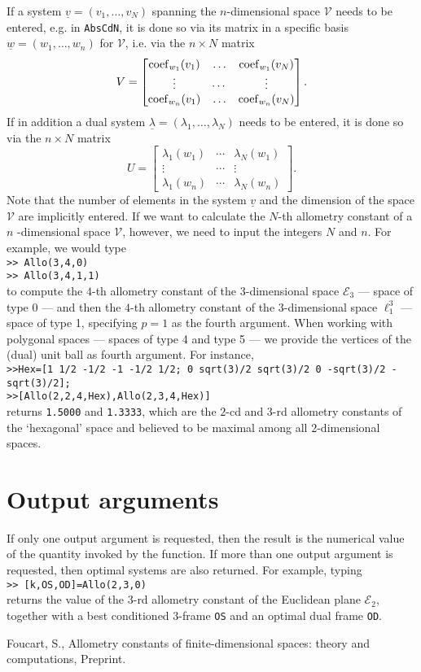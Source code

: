 \documentclass[11pt,leqno]{article}
\theoremstyle{plain}
\theoremstyle{definition}
\theoremstyle{remark}
\newcommand{\bbmx}{\begin{bmatrix}}
\newcommand{\ebmx}{\end{bmatrix}}
\newcommand{\EE}{\mathcal{E}}
\newcommand{\VV}{\mathcal{V}}
\newcommand{\ul}{\underline}
\newcommand{\la}{\lambda}
\begin{document}
 If a system $\ul{v}=(v_1,\ldots,v_N)$ spanning the $n$-dimensional space $\VV$ needs to be entered, e.g. in {\tt \small AbsCdN}, it is done so 
 via its matrix in a specific basis $\ul{w}=(w_1,\ldots,w_n)$ for $\VV$,
 i.e. via the $n \times N$ matrix
 $$
V= \bbmx
{\rm coef}_{w_1}(v_1) & \ldots & {\rm coef}_{w_1}(v_N)\\
\vdots & \cdots & \vdots\\
{\rm coef}_{w_n}(v_1) & \ldots & {\rm coef}_{w_n}(v_N)
\ebmx.
$$
If in addition a dual system $\ul{\la}=(\la_1,\ldots,\la_N)$  needs to be entered, it is done so via the $n \times N$ matrix
$$
U = \bbmx
\la_1(w_1) & \cdots & \la_N(w_1)\\
\vdots & \cdots & \vdots\\
\la_1(w_n) & \cdots & \la_N(w_n)
\ebmx .
$$
Note that the number of elements in the system $\ul{v}$ and the dimension of the space $\VV$ are implicitly  entered.
If we want to calculate the $N$-th allometry constant of a $n$ -dimensional space $\VV$, however, we need to input the integers $N$ and $n$.
For example, we would type\\
{\tt \small >> Allo(3,4,0)}\\
{\tt \small >> Allo(3,4,1,1)}\\
to compute the $4$-th allometry constant of the $3$-dimensional space $\EE_3$ --- space of type 0 --- and then the $4$-th allometry constant of the $3$-dimensional space $\ell_1^3$ --- space of type 1, specifying $p=1$ as the fourth argument.
When working with polygonal spaces --- spaces of type 4 and type 5 --- we provide the vertices of the (dual) unit ball as fourth argument. For instance,\\
{\tt \small >>Hex=[1 1/2 -1/2 -1 -1/2 1/2; 0 sqrt(3)/2 sqrt(3)/2 0 -sqrt(3)/2 -sqrt(3)/2];}\\
{\tt \small >>[Allo(2,2,4,Hex),Allo(2,3,4,Hex)]}\\
returns {\tt \small 1.5000} and {\tt \small 1.3333}, which are the $2$-cd and $3$-rd allometry constants of the `hexagonal' space and
believed to be maximal among all $2$-dimensional spaces. 

 
 \section{Output arguments}
 
 If only one output argument is requested, then the result is the numerical value of the quantity invoked by the function.
 If more than one output argument is requested, then optimal systems are also returned.
 For example, typing \\
 {\tt \small >> [k,OS,OD]=Allo(2,3,0)}\\
 returns the value of the $3$-rd allometry constant of the Euclidean plane $\EE_2$,
 together with a best conditioned $3$-frame {\tt \small OS} and an optimal dual frame {\tt \small OD}.
 


  
 
 \begin{thebibliography}{99}
 

   Foucart, S.,
  Allometry constants of finite-dimensional spaces: 
theory and computations,
 Preprint. 

  \end{thebibliography}   

 
 
\end{document}
